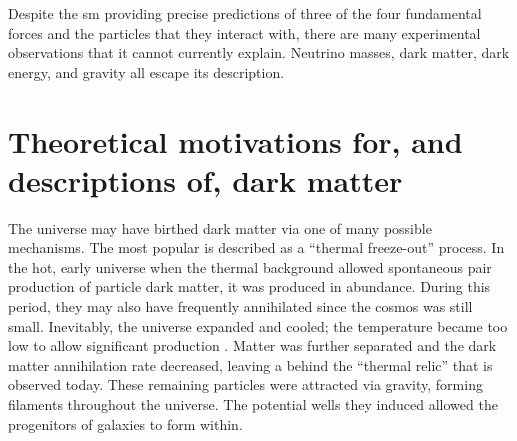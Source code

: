 
Despite the \acrlong{sm} providing precise predictions of three of the four fundamental forces and the particles that they interact with, there are many experimental observations that it cannot currently explain. Neutrino masses, dark matter, dark energy, and gravity all escape its description.



\section{Theoretical motivations for, and descriptions of, dark matter}
\label{sec:theory_dark_matter}


The universe may have birthed dark matter via one of many possible mechanisms. The most popular is described as a ``thermal freeze-out'' process. In the hot, early universe when the thermal background allowed spontaneous pair production of particle dark matter, it was produced in abundance. During this period, they may also have frequently annihilated since the cosmos was still small. Inevitably, the universe expanded and cooled; the temperature became too low to allow significant production \cite{Baldes:2017gzw}. Matter was further separated and the dark matter annihilation rate decreased, leaving a behind the ``thermal relic'' that is observed today. These remaining particles were attracted via gravity, forming filaments throughout the universe. The potential wells they induced allowed the progenitors of galaxies to form within.


\iffalse

